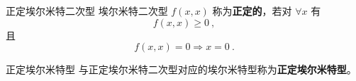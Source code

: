 \begin{definition}{正定埃尔米特二次型}
埃尔米特二次型 $f(   x,   x)$ 称为\textbf{正定的}，若对 $\forall    x$ 有
\begin{equation}
f(   x,   x)\geq0~,
\end{equation}
且
\begin{equation}
f(   x,   x)=0\Rightarrow   x=   0~.
\end{equation}
\end{definition}
\begin{definition}{正定埃尔米特型}\label{def_HeFor_1}
与正定埃尔米特二次型对应的埃尔米特型称为\textbf{正定埃尔米特型}。
\end{definition}